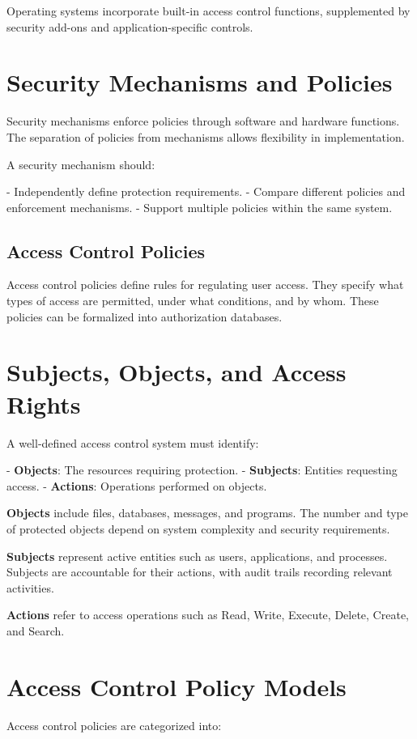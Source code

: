 Operating systems incorporate built-in access control functions, supplemented
by security add-ons and application-specific controls.

\section{Security Mechanisms and Policies}
Security mechanisms enforce policies through software and hardware functions.
The separation of policies from mechanisms allows flexibility in
implementation.

A security mechanism should:

- Independently define protection requirements.
- Compare different policies and enforcement mechanisms.
- Support multiple policies within the same system.

\subsection{Access Control Policies}
Access control policies define rules for regulating user access. They specify
what types of access are permitted, under what conditions, and by whom. These
policies can be formalized into authorization databases.

\section{Subjects, Objects, and Access Rights}
A well-defined access control system must identify:

- \textbf{Objects}: The resources requiring protection.
- \textbf{Subjects}: Entities requesting access.
- \textbf{Actions}: Operations performed on objects.

\textbf{Objects} include files, databases, messages, and programs. The number
and type of protected objects depend on system complexity and security
requirements.

\textbf{Subjects} represent active entities such as users, applications, and
processes. Subjects are accountable for their actions, with audit trails
recording relevant activities.

\textbf{Actions} refer to access operations such as Read, Write, Execute,
Delete, Create, and Search.

\section{Access Control Policy Models}
Access control policies are categorized into:


